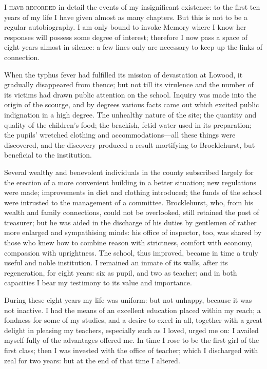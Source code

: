
 \textsc{I have recorded} in detail the events of my insignificant
existence: to the first ten years of my life I have given almost as many
chapters. But this is not to be a regular autobiography. I am only
bound to invoke Memory where I know her responses will possess some
degree of interest; therefore I now pass a space of eight years almost
in silence: a few lines only are necessary to keep up the links of
connection.

When the typhus fever had fulfilled its mission of devastation at
Lowood, it gradually disappeared from thence; but not till its virulence
and the number of its victims had drawn public attention on the school. 
Inquiry was made into the origin of the scourge, and by degrees various
facts came out which excited public indignation in a high degree. The
unhealthy nature of the site; the quantity and quality of the children's
food; the brackish, fetid water used in its preparation; the pupils'
wretched clothing and accommodations---all these things were discovered,
and the discovery produced a result mortifying to \Mr{} Brocklehurst, but
beneficial to the institution.

Several wealthy and benevolent individuals in the county subscribed
largely for the erection of a more convenient building in a better
situation; new regulations were made; improvements in diet and clothing
introduced; the funds of the school were intrusted to the management of
a committee. \Mr{} Brocklehurst, who, from his wealth and family
connections, could not be overlooked, still retained the post of
treasurer; but he was aided in the discharge of his duties by gentlemen
of rather more enlarged and sympathising minds: his office of inspector,
too, was shared by those who knew how to combine reason with strictness,
comfort with economy, compassion with uprightness. The school, thus
improved, became in time a truly useful and noble institution. I
remained an inmate of its walls, after its regeneration, for eight
years: six as pupil, and two as teacher; and in both capacities I bear
my testimony to its value and importance.

During these eight years my life was uniform: but not unhappy, because
it was not inactive. I had the means of an excellent education placed
within my reach; a fondness for some of my studies, and a desire to
excel in all, together with a great delight in pleasing my teachers,
especially such as I loved, urged me on: I availed myself fully of the
advantages offered me. In time I rose to be the first girl of the first
class; then I was invested with the office of teacher; which I
discharged with zeal for two years: but at the end of that time I
altered.

